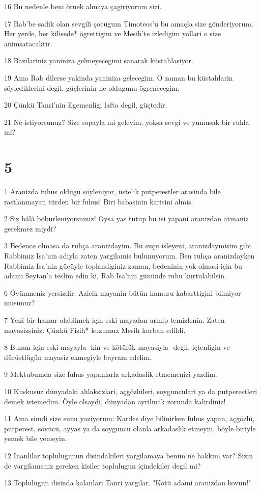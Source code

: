 \par 16 Bu nedenle beni örnek almaya çagiriyorum sizi.
\par 17 Rab'be sadik olan sevgili çocugum Timoteos'u bu amaçla size gönderiyorum. Her yerde, her kilisede* ögrettigim ve Mesih'te izledigim yollari o size animsatacaktir.
\par 18 Bazilariniz yaniniza gelmeyecegimi sanarak küstahlasiyor.
\par 19 Ama Rab dilerse yakinda yaniniza gelecegim. O zaman bu küstahlarin söylediklerini degil, güçlerinin ne oldugunu ögrenecegim.
\par 20 Çünkü Tanri'nin Egemenligi lafta degil, güçtedir.
\par 21 Ne istiyorsunuz? Size sopayla mi geleyim, yoksa sevgi ve yumusak bir ruhla mi?

\chapter{5}

\par 1 Aranizda fuhus oldugu söyleniyor, üstelik putperestler arasinda bile rastlanmayan türden bir fuhus! Biri babasinin karisini almis.
\par 2 Siz hâlâ böbürleniyorsunuz! Oysa yas tutup bu isi yapani aranizdan atmaniz gerekmez miydi?
\par 3 Bedence olmasa da ruhça aranizdayim. Bu suçu isleyeni, aranizdaymisim gibi Rabbimiz Isa'nin adiyla zaten yargilamis bulunuyorum. Ben ruhça aranizdayken Rabbimiz Isa'nin gücüyle toplandiginiz zaman, bedeninin yok olmasi için bu adami Seytan'a teslim edin ki, Rab Isa'nin gününde ruhu kurtulabilsin.
\par 6 Övünmeniz yersizdir. Azicik mayanin bütün hamuru kabarttigini bilmiyor musunuz?
\par 7 Yeni bir hamur olabilmek için eski mayadan arinip temizlenin. Zaten mayasizsiniz. Çünkü Fisih* kuzumuz Mesih kurban edildi.
\par 8 Bunun için eski mayayla -kin ve kötülük mayasiyla- degil, içtenligin ve dürüstlügün mayasiz ekmegiyle bayram edelim.
\par 9 Mektubumda size fuhus yapanlarla arkadaslik etmemenizi yazdim.
\par 10 Kuskusuz dünyadaki ahlaksizlari, açgözlüleri, soygunculari ya da putperestleri demek istemedim. Öyle olsaydi, dünyadan ayrilmak zorunda kalirdiniz!
\par 11 Ama simdi size sunu yaziyorum: Kardes diye bilinirken fuhus yapan, açgözlü, putperest, sövücü, ayyas ya da soyguncu olanla arkadaslik etmeyin, böyle biriyle yemek bile yemeyin.
\par 12 Inanlilar toplulugunun disindakileri yargilamaya benim ne hakkim var? Sizin de yargilamaniz gereken kisiler toplulugun içindekiler degil mi?
\par 13 Toplulugun disinda kalanlari Tanri yargilar. "Kötü adami aranizdan kovun!"

